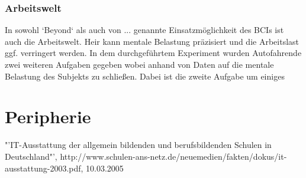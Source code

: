 \documentclass[11pt]{article} %
\begin{document}
\subsubsection{Arbeitswelt}
In sowohl `Beyond` als auch von ... genannte Einsatzmöglichkeit des BCIs ist auch die Arbeitswelt. Heir kann mentale Belastung präzisiert und die Arbeitslast ggf. verringert werden.
In dem durchgeführtem Experiment wurden Autofahrende zwei weiteren Aufgaben gegeben wobei anhand von Daten auf die mentale Belastung des Subjekts zu schließen. Dabei ist die zweite Aufgabe  um einiges 
\section{Peripherie}

\begin{thebibliography}{xxxxxxxxxxxxxxxxxxx}
   "'IT-Ausstattung der allgemein bildenden und berufsbildenden Schulen in Deutschland"', http://www.schulen-ans-netz.de/neuemedien/fakten/dokus/it-ausstattung-2003.pdf, 10.03.2005
\end{thebibliography}
\end{document}
